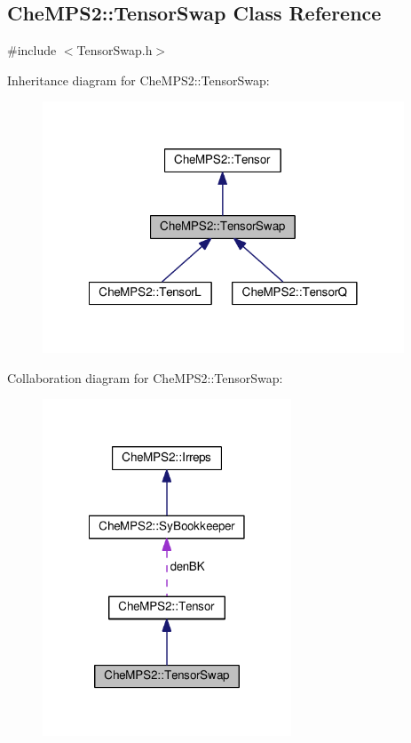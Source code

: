 \hypertarget{classCheMPS2_1_1TensorSwap}{\subsection{Che\-M\-P\-S2\-:\-:Tensor\-Swap Class Reference}
\label{classCheMPS2_1_1TensorSwap}
}


{\ttfamily \#include $<$Tensor\-Swap.\-h$>$}



Inheritance diagram for Che\-M\-P\-S2\-:\-:Tensor\-Swap\-:\nopagebreak
\begin{figure}[H]
\begin{center}
\leavevmode
\includegraphics[width=305pt]{classCheMPS2_1_1TensorSwap__inherit__graph}
\end{center}
\end{figure}


Collaboration diagram for Che\-M\-P\-S2\-:\-:Tensor\-Swap\-:\nopagebreak
\begin{figure}[H]
\begin{center}
\leavevmode
\includegraphics[width=210pt]{classCheMPS2_1_1TensorSwap__coll__graph}
\end{center}
\end{figure}
